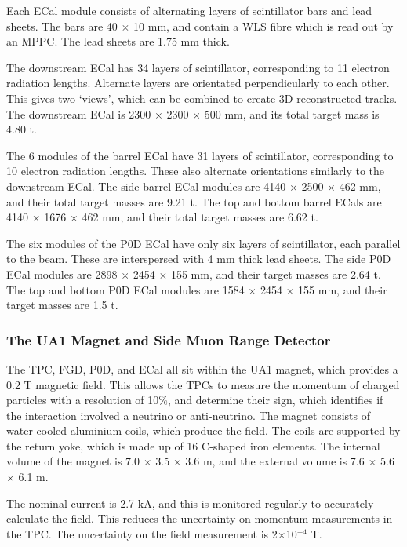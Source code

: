 Each ECal module consists of alternating layers of scintillator bars and lead sheets. The bars are 40 $\times$ 10 mm, and contain a WLS fibre which is read out by an MPPC. The lead sheets are 1.75 mm thick.

The downstream ECal has 34 layers of scintillator, corresponding to 11 electron radiation lengths. Alternate layers are orientated perpendicularly to each other. This gives two `views', which can be combined to create 3D reconstructed tracks. The downstream ECal is 2300 $\times$ 2300 $\times$ 500 mm, and its total target mass is 4.80 t.

The 6 modules of the barrel ECal have 31 layers of scintillator, corresponding to 10 electron radiation lengths. These also alternate orientations similarly to the downstream ECal. The side barrel ECal modules are 4140 $\times$ 2500 $\times$ 462 mm, and their total target masses are 9.21 t. The top and bottom barrel ECals are 4140 $\times$ 1676 $\times$ 462 mm, and their total target masses are 6.62 t.

The six modules of the P0D ECal have only six layers of scintillator, each parallel to the beam. These are interspersed with 4 mm thick lead sheets. The side P0D ECal modules are 2898 $\times$ 2454 $\times$ 155 mm, and their target masses are 2.64 t. The top and bottom P0D ECal modules are 1584 $\times$ 2454 $\times$ 155 mm, and their target masses are 1.5 t.

\subsubsection{The UA1 Magnet and Side Muon Range Detector}\label{sec:mag}

The TPC, FGD, P0D, and ECal all sit within the UA1\cite{UA1} magnet, which provides a 0.2 T magnetic field. This allows the TPCs to measure the momentum of charged particles with a resolution of 10$\%$, and determine their sign, which identifies if the interaction involved a neutrino or anti-neutrino. The magnet consists of water-cooled aluminium coils, which produce the field. The coils are supported by the return yoke, which is made up of 16 C-shaped iron elements. The internal volume of the magnet is 7.0 $\times$ 3.5 $\times$ 3.6 m, and the external volume is 7.6 $\times$ 5.6 $\times$ 6.1 m.

The nominal current is 2.7 kA, and this is monitored regularly to accurately calculate the field. This reduces the uncertainty on momentum measurements in the TPC. The uncertainty on the field measurement is 2$\times$10$^{-4}$ T.

